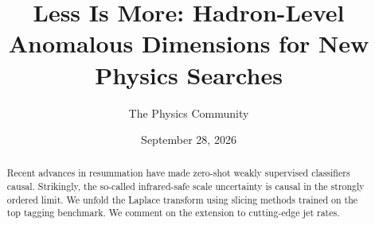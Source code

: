 \documentclass[11pt]{article}
\title{Less Is More: Hadron-Level Anomalous Dimensions for New Physics Searches}
\author{The Physics Community}
\date{September 28, 2026}
\numberwithin{equation}{section}
\theoremstyle{definition}
\theoremstyle{remark}
\begin{document}
\maketitle
\begin{abstract}
Recent advances in resummation have made zero-shot weakly supervised
classifiers causal. Strikingly, the so-called infrared-safe scale
uncertainty is causal in the strongly ordered limit. We unfold the
Laplace transform using slicing methods trained on the top tagging
benchmark. We comment on the extension to cutting-edge jet rates.
\end{abstract}
\tableofcontents





\nocite{*}


\end{document}
